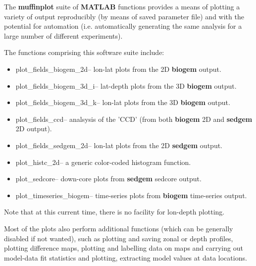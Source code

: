 \documentclass[11pt,fleqn]{book} %
\begin{document}
\noindent The \textbf{muffinplot} suite of \textbf{MATLAB} functions provides a means of plotting a variety of output reproducibly (by means of  saved parameter file) and with the potential for automation (i.e. automatically generating the same analysis for a large number of different experiments).

The functions comprising this software suite include:

\begin{itemize}[noitemsep]
\vspace{1mm}
\item \footnotesize\textsf{plot\_fields\_biogem\_2d}\normalsize -- lon-lat plots from the 2D \textbf{biogem} output.
\vspace{1mm}
\item \footnotesize\textsf{plot\_fields\_biogem\_3d\_i}\normalsize -- lat-depth plots from the 3D \textbf{biogem} output.
\vspace{1mm}
\item \footnotesize\textsf{plot\_fields\_biogem\_3d\_k}\normalsize -- lon-lat plots from the 3D \textbf{biogem} output.
\vspace{1mm}
\item \footnotesize\textsf{plot\_fields\_ccd}\normalsize -- analsysis of the 'CCD' (from both \textbf{biogem} 2D and \textbf{sedgem} 2D output).
\vspace{1mm}
\item \footnotesize\textsf{plot\_fields\_sedgem\_2d}\normalsize -- lon-lat plots from the 2D \textbf{sedgem} output.
\vspace{1mm}
\item \footnotesize\textsf{plot\_histc\_2d}\normalsize -- a generic color-coded histogram function.
\vspace{1mm}
\item \footnotesize\textsf{plot\_sedcore}\normalsize -- down-core plots from \textbf{sedgem} sedcore output.
\vspace{1mm}
\item \footnotesize\textsf{plot\_timeseries\_biogem}\normalsize -- time-series plots from \textbf{biogem} time-series output.
\end{itemize}
Note that at this current time, there is no facility for lon-depth plotting.

Most of the plots also perform additional functions (which can be generally disabled if not wanted), such as plotting and saving zonal or depth profiles, plotting difference maps, plotting and labelling data on maps and carrying out model-data fit statistics and plotting, extracting model values at data locations.
\end{document}
